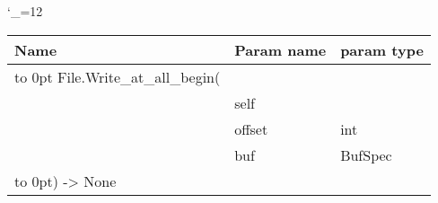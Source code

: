 \begingroup \catcode`\_=12 \tt
\begin{tabular}{lll}
\toprule
\textrm{Name}&\textrm{Param name}&\textrm{param type}\\
\midrule
\hbox to 0pt {File.Write_at_all_begin(\hss}\\
& self\\
& offset & int\\
& buf & BufSpec\\
\hbox to 0pt{) -> None\hss}\\
\bottomrule
\end{tabular}
\endgroup
